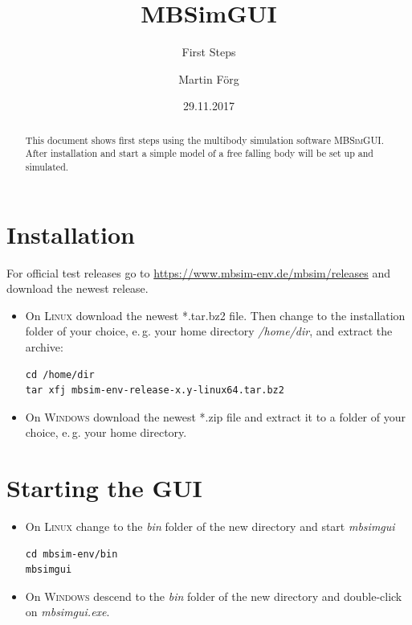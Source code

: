 \documentclass[
a4paper,
fleqn,
DIV=15,
pagesize
]{scrartcl}
\begin{document}
\subject{MBSim -- Environment}
\title{MBSimGUI}
\subtitle{First Steps}
\author{Martin Förg}
\date{29.11.2017}

\maketitle

\begin{abstract}
This document shows first steps using the multibody simulation software
\textsc{MBSimGUI}. After installation and start a
simple model of a free falling body will be set up and simulated.
\end{abstract}


\tableofcontents


\section{Installation}
For official test releases go to \url{https://www.mbsim-env.de/mbsim/releases}
and download the newest release.
\begin{itemize}
\item On \textsc{Linux} 
download the newest *.tar.bz2 file.
Then change to the installation folder of your choice, e.\,g. your home directory
\emph{/home/dir}, and extract the archive:
\begin{verbatim}
cd /home/dir
tar xfj mbsim-env-release-x.y-linux64.tar.bz2
\end{verbatim}

\item On \textsc{Windows} 
download the newest *.zip file
and extract it to a folder of your choice, e.\,g. your home directory.
\end{itemize}

\section{Starting the GUI}

\begin{itemize}
\item On \textsc{Linux} change to the \emph{bin} folder of the new directory and start
\emph{mbsimgui}
\begin{verbatim}
cd mbsim-env/bin
mbsimgui
\end{verbatim}

\item On \textsc{Windows} 
descend to the \emph{bin} folder of the new directory and double-click on
\emph{mbsimgui.exe}.
\end{itemize}
\end{document}
